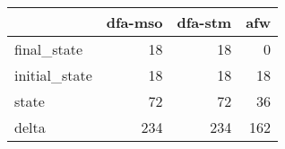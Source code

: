 \begin{tabular}{lrrr}
\toprule
{} &  dfa-mso &  dfa-stm &  afw \\
\midrule
final\_state   &       18 &       18 &    0 \\
initial\_state &       18 &       18 &   18 \\
state         &       72 &       72 &   36 \\
delta         &      234 &      234 &  162 \\
\bottomrule
\end{tabular}
